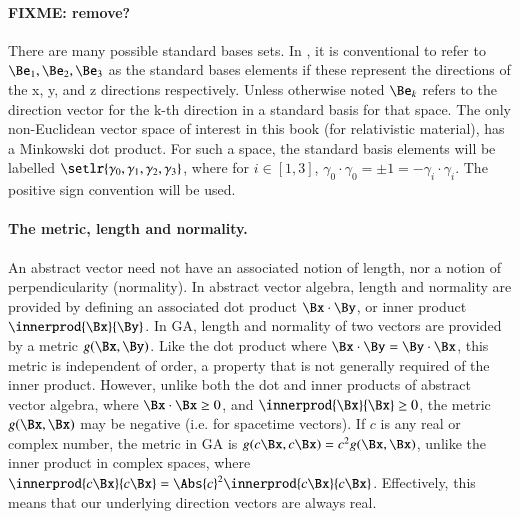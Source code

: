 \paragraph{FIXME: remove?}
There are many possible standard bases sets.  In , it is conventional to refer to \( \Be_1, \Be_2, \Be_3 \) as the standard bases elements if these represent the directions of the x, y, and z directions respectively.  Unless otherwise noted \( \Be_k \) refers to the direction vector for the k-th direction in a standard basis for that space.
The only non-Euclidean vector space of interest in this book (for relativistic material), has a Minkowski dot product.  For such a space, the standard basis elements will be labelled \( \setlr{ \gamma_0, \gamma_1, \gamma_2, \gamma_3 } \), where for \( i \in [1,3] \), \( \gamma_0 \cdot \gamma_0 = \pm 1 = -\gamma_i \cdot \gamma_i \).  The positive sign convention will be used.

%

\paragraph{The metric, length and normality.}

An abstract vector need not have an associated notion of length, nor a notion of perpendicularity (normality).
In abstract vector algebra, length and normality are provided by defining an associated dot product \(\Bx \cdot \By\), or inner product \(\innerprod{\Bx}{\By}\).
In GA, length and normality of two vectors are provided by a metric \(g(\Bx, \By)\).
Like the dot product where \( \Bx \cdot \By = \By \cdot \Bx\), this metric is independent of order, a property that is not generally required of the inner product.
However, unlike both the dot and inner products of abstract vector algebra, where \( \Bx \cdot \Bx \ge 0\), and \( \innerprod{\Bx}{\Bx} \ge 0\), the metric \(g(\Bx, \Bx)\) may be negative (i.e. for spacetime vectors).
If \(c \) is any real or complex number, the metric in GA is \( g(c \Bx, c \Bx) = c^2 g(\Bx, \Bx)\), unlike the inner product in complex spaces, where \( \innerprod{c \Bx}{c \Bx} = \Abs{c}^2 \innerprod{c \Bx}{c \Bx} \).
Effectively, this means that our underlying direction vectors are always real.


